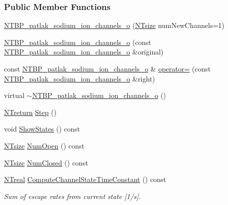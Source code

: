 \subsubsection*{Public Member Functions}
\begin{DoxyCompactItemize}
\item 
\hyperlink{class_n_t_b_p__patlak__sodium__ion__channels__o_a5a698f12acb41867030efca9bf528da4}{NTBP\_\-patlak\_\-sodium\_\-ion\_\-channels\_\-o} (\hyperlink{nt__types_8h_a06c124f2e4469769b58230253ce0560b}{NTsize} numNewChannels=1)
\item 
\hyperlink{class_n_t_b_p__patlak__sodium__ion__channels__o_a4eaa51d0e2856e8ffaf108e64a322894}{NTBP\_\-patlak\_\-sodium\_\-ion\_\-channels\_\-o} (const \hyperlink{class_n_t_b_p__patlak__sodium__ion__channels__o}{NTBP\_\-patlak\_\-sodium\_\-ion\_\-channels\_\-o} \&original)
\item 
const \hyperlink{class_n_t_b_p__patlak__sodium__ion__channels__o}{NTBP\_\-patlak\_\-sodium\_\-ion\_\-channels\_\-o} \& \hyperlink{class_n_t_b_p__patlak__sodium__ion__channels__o_a343ac249b838715975349288013ae31b}{operator=} (const \hyperlink{class_n_t_b_p__patlak__sodium__ion__channels__o}{NTBP\_\-patlak\_\-sodium\_\-ion\_\-channels\_\-o} \&right)
\item 
virtual \hyperlink{class_n_t_b_p__patlak__sodium__ion__channels__o_a3b0811d1a13847a64eb759c90440e021}{$\sim$NTBP\_\-patlak\_\-sodium\_\-ion\_\-channels\_\-o} ()
\item 
\hyperlink{nt__types_8h_ab9564ee8f091e809d21b8451c6683c53}{NTreturn} \hyperlink{class_n_t_b_p__patlak__sodium__ion__channels__o_a3f3d8ee4ecfd116d0e19827f155d5311}{Step} ()
\item 
void \hyperlink{class_n_t_b_p__patlak__sodium__ion__channels__o_a85d7ec33e88d15d1241743adcbb715c1}{ShowStates} () const 
\item 
\hyperlink{nt__types_8h_a06c124f2e4469769b58230253ce0560b}{NTsize} \hyperlink{class_n_t_b_p__patlak__sodium__ion__channels__o_a8995eeb87fc7de8351c1ded3a6e50c5d}{NumOpen} () const 
\item 
\hyperlink{nt__types_8h_a06c124f2e4469769b58230253ce0560b}{NTsize} \hyperlink{class_n_t_b_p__patlak__sodium__ion__channels__o_af91d8d1fa40e08247e0015e02967a5f9}{NumClosed} () const 
\item 
\hyperlink{nt__types_8h_a814a97893e9deb1eedcc7604529ba80d}{NTreal} \hyperlink{class_n_t_b_p__patlak__sodium__ion__channels__o_a993416d61d13fbc227b7af744ad6eafe}{ComputeChannelStateTimeConstant} () const 
\begin{DoxyCompactList}\small\item\em Sum of escape rates from current state \mbox{[}1/s\mbox{]}. \item\end{DoxyCompactList}\item 

\end{DoxyCompactItemize}
